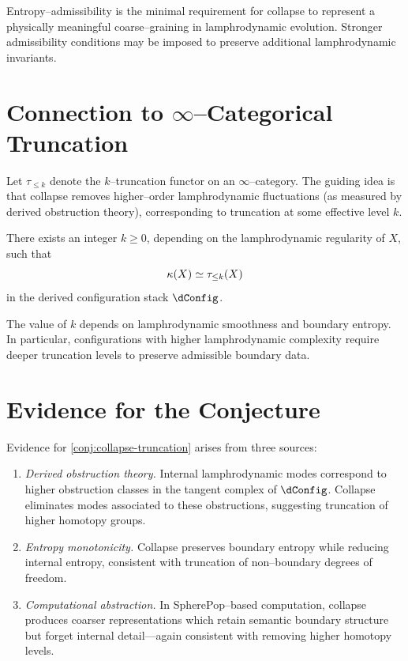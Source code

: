 \begin{remark}
Entropy--admissibility is the minimal requirement for collapse to
represent a physically meaningful coarse--graining in lamphrodynamic
evolution. Stronger admissibility conditions may be imposed to preserve
additional lamphrodynamic invariants.
\end{remark}

\section{Connection to $\infty$--Categorical Truncation}

Let $\tau_{\leq k}$ denote the $k$--truncation functor on an
$\infty$--category. The guiding idea is that collapse removes
higher--order lamphrodynamic fluctuations (as measured by derived
obstruction theory), corresponding to truncation at some effective
level $k$.

\begin{conjecture}
\label{conj:collapse-truncation}
There exists an integer $k \geq 0$, depending on the lamphrodynamic
regularity of $X$, such that
\[
  \kappa(X) \simeq \tau_{\leq k}(X)
\]
in the derived configuration stack $\dConfig$.
\end{conjecture}

\begin{remark}
The value of $k$ depends on lamphrodynamic smoothness and boundary
entropy. In particular, configurations with higher lamphrodynamic
complexity require deeper truncation levels to preserve admissible
boundary data.
\end{remark}

\section{Evidence for the Conjecture}

Evidence for \cref{conj:collapse-truncation} arises from three sources:

\begin{enumerate}
\item \emph{Derived obstruction theory.} Internal lamphrodynamic modes
correspond to higher obstruction classes in the tangent complex of
$\dConfig$. Collapse eliminates modes associated to these obstructions,
suggesting truncation of higher homotopy groups.

\item \emph{Entropy monotonicity.} Collapse preserves boundary entropy
while reducing internal entropy, consistent with truncation of
non--boundary degrees of freedom.

\item \emph{Computational abstraction.} In SpherePop--based computation,
collapse produces coarser representations which retain semantic boundary
structure but forget internal detail---again consistent with removing
higher homotopy levels.
\end{enumerate}

